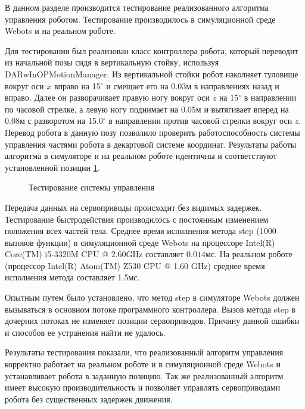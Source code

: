В данном разделе производится тестирование реализованного алгоритма управления роботом. Тестирование производилось в симуляционной среде Webots и на реальном роботе. 

Для тестирования был реализован класс контроллера робота, который переводит из начальной позы сидя в вертикальную стойку, используя DARwInOPMotionManager. Из вертикальной стойки робот наколняет туловище вокруг оси $x$ вправо на 15$^{\circ}$ и смещает его на 0.03м в направлениях назад и вправо. Далее он разворачивает правую ногу вокруг оси $z$ на 15$^{\circ}$ в направлении по часовой стрелке, а левую ногу поднимает на 0.05м и вытягивает вперед на 0.08м с разворотом на 15.0$^{\circ}$ в направлении против часовой стрелки вокруг оси $z$. Перевод робота в данную позу позволило проверить работоспособность системы управления частями робота в декартовой системе координат. Результаты работы алгоритма в симуляторе и на реальном роботе идентичны и соответствуют установленной позиции \ref{im:2_testing_pose}.

\begin{figure}[h]
\caption{Тестирование системы управления}
\label{im:2_testing_pose}
\end{figure}

Передача данных на сервоприводы происходит без видимых задержек. Тестирование быстродействия производилось с постоянным изменением положения всех частей тела. Среднее время исполнения метода step (1000 вызовов функции) в симуляционной среде Webots на процессоре  Intel(R) Core(TM) i5-3320M CPU @ 2.60GHz составляет $0.014$мс. На реальном роботе (процессор Intel(R) Atom(TM)  Z530 CPU @ 1.60 GHz) среднее время исполнения метода составляет 1.5мс.

Опытным путем было установлено, что метод step в симуляторе Webots должен вызываться в основном потоке программного контроллера. Вызов метода step в дочерних потоках не изменяет позиции сервоприводов. Причину данной ошибки и способов ее устранения найти не удалось.

Результаты тестирования показали, что реализованный алгоритм управления корректно работает на реальном роботе и в симуляционной среде Webots и устанавливает робота в заданную позицию. Так же реализованный алгоритм имеет высокую производительность и позволяет управлять сервоприводами робота без существенных задержек движения.
